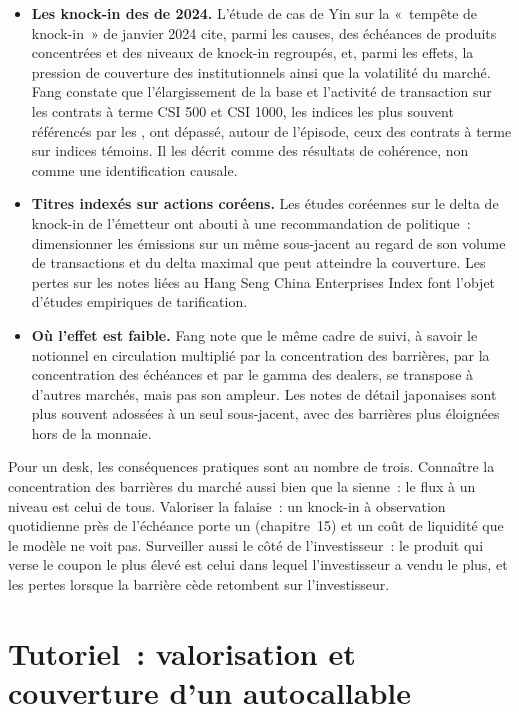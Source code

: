 \begin{itemize}
\item \textbf{Les knock-in des  de 2024.} L'étude de cas de Yin sur la «~tempête de knock-in~» de janvier 2024 cite, parmi les causes, des échéances de produits concentrées
et des niveaux de knock-in regroupés, et, parmi les effets, la pression de couverture des institutionnels ainsi que la volatilité du marché.
Fang constate que l'élargissement de la base et l'activité de transaction sur les contrats à terme CSI 500 et CSI 1000, les indices les plus souvent référencés par les ,
ont dépassé, autour de l'épisode, ceux des contrats à terme sur indices témoins. Il les décrit comme des résultats de cohérence, non comme une identification
causale.
\item \textbf{Titres indexés sur actions coréens.} Les études coréennes sur le delta de knock-in de l'émetteur ont abouti à une recommandation de politique~: dimensionner
les émissions sur un même sous-jacent au regard de son volume de transactions et du delta maximal que peut atteindre la couverture. Les pertes sur les notes liées au
Hang Seng China Enterprises Index font l'objet d'études empiriques de tarification.
\item \textbf{Où l'effet est faible.} Fang note que le même cadre de suivi, à savoir le notionnel en circulation multiplié par la concentration des barrières,
par la concentration des échéances et par le gamma des dealers, se transpose à d'autres marchés, mais pas son ampleur. Les notes de détail japonaises
sont plus souvent adossées à un seul sous-jacent, avec des barrières plus éloignées hors de la monnaie.
\end{itemize}

Pour un desk, les conséquences pratiques sont au nombre de trois. Connaître la concentration des barrières du marché aussi bien que la sienne~: le flux à un niveau
est celui de tous. Valoriser la falaise~: un knock-in à observation quotidienne près de l'échéance porte un  (chapitre~15) et un coût de liquidité que le modèle
ne voit pas. Surveiller aussi le côté de l'investisseur~: le produit qui verse le coupon le plus élevé est celui dans lequel l'investisseur a vendu le
plus, et les pertes lorsque la barrière cède retombent sur l'investisseur.

\section{Tutoriel~: valorisation et couverture d'un autocallable}\label{tut:dv:autocallables:tut}


